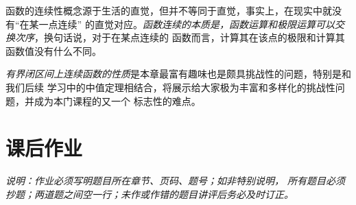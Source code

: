 函数的连续性概念源于生活的直觉，但并不等同于直觉，事实上，在现实中就没有“在某一点连续”
的直觉对应。{\it 函数连续的本质是，函数运算和极限运算可以交换次序}，换句话说，对于在某点连续的
函数而言，计算其在该点的极限和计算其函数值没有什么不同。

{\it 有界闭区间上连续函数的性质}是本章最富有趣味也是颇具挑战性的问题，特别是和我们后续
学习中的中值定理相结合，将展示给大家极为丰富和多样化的挑战性问题，并成为本门课程的又一个
标志性的难点。

\newpage

\section*{课后作业}
{\b\it 说明：作业必须写明题目所在章节、页码、题号；如非特别说明，
所有题目必须抄题；两道题之间空一行；未作或作错的题目讲评后务必及时订正。}

